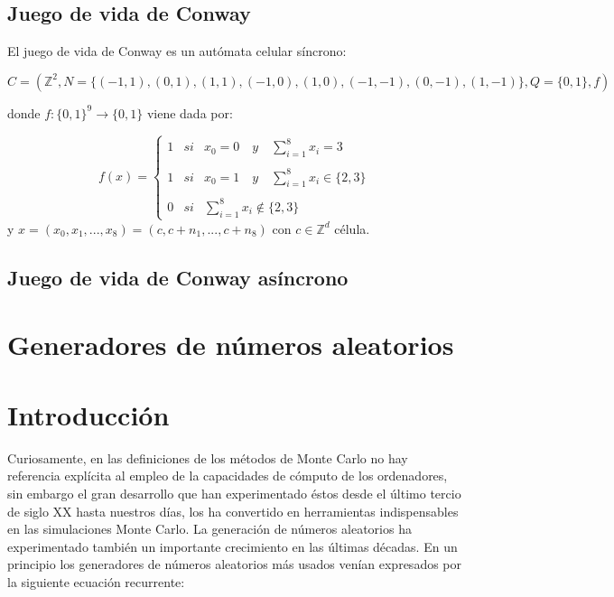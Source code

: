 \documentclass[../proyecto.tex]{memoir}
\begin{document}
\subsection{Juego de vida de Conway}

\begin{defi}
El juego de vida de Conway es un autómata celular síncrono:

\begin{equation}
C = (\mathds{Z}^{2} , N=\{(-1, 1), (0, 1), (1, 1), (-1, 0), (1, 0), (-1,-1), (0,-1), (1,-1) \}, Q=\{0,1\}, f)
\end{equation}
 
donde $f:\{0,1\}^{9} \rightarrow \{0,1\} $ viene dada por:

\begin{equation}
f(x)= \left\{ \begin{array}{lcc}
             1 &   si  & x_{0}=0 \quad y \quad \sum_{i=1}^{8} x_i = 3 \\
             \\ 1 & si & x_{0}=1 \quad y \quad \sum_{i=1}^{8} x_i \in \{2 ,3\} \\
             \\ 0 &  si  & \sum_{i=1}^{8} x_i \notin \{2, 3\} \
             \end{array}
   \right. 
\end{equation}
y $x = (x_{0}, x_{1}, ...,x_{8}) = (c,c+n_{1},...,c+n_{8})$ con $c \in \mathds{Z} ^{d}$ célula.
\end{defi}

\subsection{Juego de vida de Conway asíncrono}

\begin{defi}
\end{defi}


\section{Generadores de números aleatorios}

\section{Introducción}

Curiosamente, en las definiciones de los métodos de Monte Carlo no hay referencia explícita al empleo de la capacidades de cómputo de los ordenadores, sin embargo el gran desarrollo que han experimentado éstos desde el último tercio de siglo XX hasta nuestros días, los ha convertido en herramientas indispensables en las simulaciones Monte Carlo. La generación de números aleatorios ha experimentado también un importante crecimiento en las últimas décadas. En un principio los generadores de números aleatorios  más usados venían expresados por la siguiente ecuación recurrente:
\end{document}
